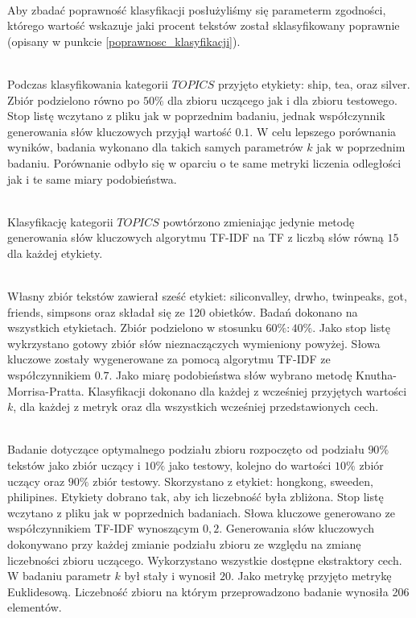 \documentclass{classrep}
\begin{document}
\\ Aby zbadać poprawność klasyfikacji posłużyliśmy się parameterm zgodności, którego wartość wskazuje
jaki procent tekstów został sklasyfikowany poprawnie (opisany w punkcie \ref{poprawnosc_klasyfikacji}).

\\Podczas klasyfikowania kategorii $TOPICS$ przyjęto etykiety: ship, tea, oraz silver.
Zbiór podzielono równo po $50\%$ dla zbioru uczącego jak i dla zbioru testowego. Stop listę wczytano z pliku
jak w poprzednim badaniu, jednak współczynnik generowania słów kluczowych przyjął wartość $0.1$. W celu lepszego
porównania wyników, badania wykonano dla takich samych parametrów $k$ jak w poprzednim badaniu. Porównanie odbyło
się w oparciu o te same metryki liczenia odległości jak i te same miary podobieństwa.

\\Klasyfikację kategorii $TOPICS$ powtórzono zmieniając jedynie
metodę generowania słów kluczowych algorytmu TF-IDF na TF z liczbą słów równą $15$ dla każdej etykiety.

\\Własny zbiór tekstów zawierał sześć etykiet: siliconvalley, drwho, twinpeaks, got, friends, simpsons
oraz składał się ze 120 obietków. Badań dokonano na wszystkich etykietach. Zbiór podzielono
w stosunku $60\%:40\%$. Jako stop listę wykrzystano
gotowy zbiór słów nieznaczączych wymieniony powyżej. Słowa kluczowe zostały wygenerowane za pomocą
algorytmu TF-IDF ze współczynnikiem $0.7$. Jako miarę podobieństwa słów wybrano metodę Knutha-Morrisa-Pratta.
Klasyfikacji dokonano dla każdej z wcześniej przyjętych wartości $k$, dla każdej z metryk oraz dla
wszystkich wcześniej przedstawionych cech.

\\Badanie dotyczące optymalnego podziału zbioru rozpoczęto od podziału $90\%$ tekstów jako zbiór uczący i
$10\%$ jako testowy, kolejno do wartości $10\%$ zbiór uczący oraz $90\%$ zbiór testowy. Skorzystano z
etykiet: hongkong, sweeden, philipines. Etykiety dobrano tak, aby ich liczebność była zbliżona.
Stop listę wczytano z pliku jak w poprzednich badaniach. Słowa kluczowe generowano ze współczynnikiem
TF-IDF wynoszącym $0,2$. Generowania słów kluczowych dokonywano przy każdej zmianie podziału zbioru
ze względu na zmianę liczebności zbioru uczącego. Wykorzystano wszystkie dostępne ekstraktory cech.
W badaniu parametr $k$ był
stały i wynosił $20$. Jako metrykę przyjęto metrykę Euklidesową. Liczebność zbioru na którym
przeprowadzono badanie wynosiła 206 elementów.
\end{document}

